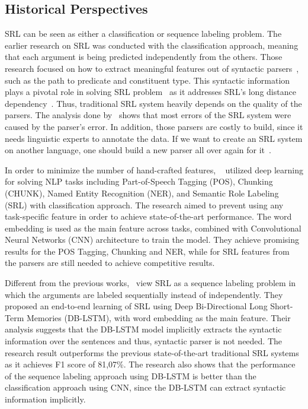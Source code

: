 \subsection{Historical Perspectives}
SRL can be seen as either a classification or sequence labeling problem. The earlier research on SRL was conducted with the classification approach, meaning that each argument is being predicted independently from the others. Those research focused on how to extract meaningful features out of syntactic parsers~\citep{gildea2002automatic, gildea2002necessity, pradhan2005semantic}, such as the path to predicate and constituent type. This syntactic information plays a pivotal role in solving SRL problem~\citep{punyakanok2008importance} as it addresses SRL's long distance dependency~\citep{zhou2015end}. Thus, traditional SRL system heavily depends on the quality of the parsers. The analysis done by~\cite{pradhan2005semantic} shows that most errors of the SRL system were caused by the parser's error. In addition, those parsers are costly to build, since it needs linguistic experts to annotate the data. If we want to create an SRL system on another language, one should build a new parser all over again for it~\citep{zhou2015end}.

In order to minimize the number of hand-crafted features, ~\cite{collobert2011natural} utilized deep learning for solving NLP tasks including Part-of-Speech Tagging (POS), Chunking (CHUNK), Named Entity Recognition (NER), and Semantic Role Labeling (SRL) with classification approach. The research aimed to prevent using any task-specific feature in order to achieve state-of-the-art performance. The word embedding is used as the main feature across tasks, combined with Convolutional Neural Networks (CNN) architecture to train the model. They achieve promising results for the POS Tagging, Chunking and NER, while for SRL features from the parsers are still needed to achieve competitive results.

Different from the previous works,~\cite{zhou2015end} view SRL as a sequence labeling problem in which the arguments are labeled sequentially instead of independently. They proposed an end-to-end learning of SRL using Deep Bi-Directional Long Short-Term Memories (DB-LSTM), with word embedding as the main feature. Their analysis suggests that the DB-LSTM model implicitly extracts the syntactic information over the sentences and thus, syntactic parser is not needed. The research result outperforms the previous state-of-the-art traditional SRL systems as it achieves F1 score of 81,07\%. The research also shows that the performance of the sequence labeling approach using DB-LSTM is better than the classification approach using CNN, since the DB-LSTM can extract syntactic information implicitly.

